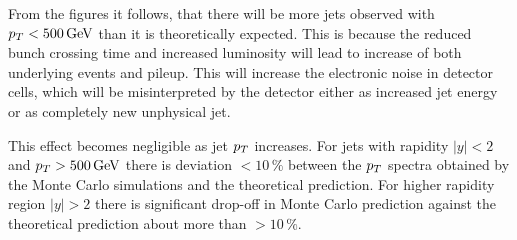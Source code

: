From the figures it follows, that there will be more jets observed with $p_{T} <
500\,\text{GeV}$ than it is theoretically expected. This is because the reduced bunch
crossing time and increased luminosity will lead to increase of both underlying
events and pileup. This will increase the electronic noise in detector cells,
which will be misinterpreted by the detector either as increased jet energy or
as completely new unphysical jet. 

This effect becomes negligible as jet $p_{T}$ increases. For jets with rapidity
$|y|<2$ and $p_{T} > 500\,\text{GeV}$ there is deviation $<10\,\%$ between the $p_{T}$
spectra obtained by the Monte Carlo simulations and the theoretical prediction.
For higher rapidity region $|y|>2$ there is significant drop-off in Monte Carlo
prediction against the theoretical prediction about more than $>10\,\%$.

